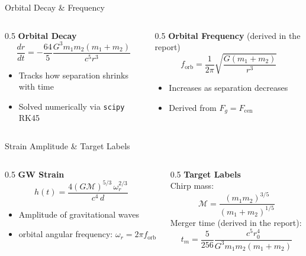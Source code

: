 \documentclass[aspectratio=169]{beamer}
\begin{document}
\begin{frame}{Orbital Decay \& Frequency}
  \begin{columns}
    \begin{column}{0.5\textwidth}
    \vspace{0.2cm}
      \textbf{Orbital Decay} \parencite{Peters1964}
      \[
        \frac{dr}{dt} = -\frac{64}{5}\frac{G^3 m_1 m_2 (m_1+m_2)}{c^5 r^3}
      \]
      \begin{itemize}
        \item Tracks how separation shrinks with time
        \vspace{0.2cm}
        \item Solved numerically via \texttt{scipy} RK45
      \end{itemize}
    \end{column}
    \begin{column}{0.5\textwidth}
      \textbf{Orbital Frequency} (derived in the report)
        \vspace{0.2cm}
      \[
        f_\text{orb} = \frac{1}{2\pi}\sqrt{\frac{G(m_1+m_2)}{r^3}}
      \]
      \begin{itemize}
        \item Increases as separation decreases
        \vspace{0.2cm}
        \item Derived from $F_g = F_\text{cen}$
      \end{itemize}
    \end{column}
  \end{columns}
\end{frame}

\begin{frame}{Strain Amplitude \& Target Labels}
  \begin{columns}
    \begin{column}{0.5\textwidth}
      \textbf{GW Strain} \parencite{Creighton2026}
      \vspace{0.2cm}
      \[
        h(t) = \frac{4(G\mathcal{M})^{5/3}\,\omega_r^{2/3}}{c^4\,d}
      \]
      \begin{itemize}
        \item Amplitude of gravitational waves
        \item orbital angular frequency: $\omega_r = 2\pi f_\text{orb}$
      \end{itemize}
    \end{column}
    \begin{column}{0.5\textwidth}
      \textbf{Target Labels}\\[0.5em]
      \vspace{0.2cm}
      Chirp mass:
      \[
        \mathcal{M} = \frac{(m_1 m_2)^{3/5}}{(m_1+m_2)^{1/5}}
      \]
      \vspace{0.2cm}
      Merger time (derived in the report):
      \[
        t_m = \frac{5}{256}\frac{c^5 r_0^4}{G^3 m_1 m_2(m_1+m_2)}
      \]
    \end{column}
  \end{columns}
\end{frame}
\end{document}
